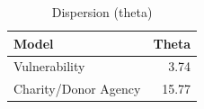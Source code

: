 \begin{table}[ht]
\centering
\begin{tabular}{lr}
  \hline
Model & Theta \\ 
  \hline
Vulnerability & 3.74 \\ 
  Charity/Donor Agency & 15.77 \\ 
   \hline
\end{tabular}
\caption{Dispersion (theta)} 
\end{table}
